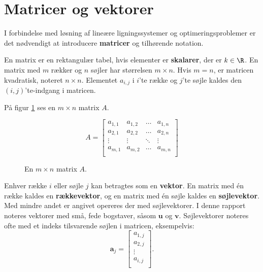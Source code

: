\section{Matricer og vektorer}
%  
%
I forbindelse med løsning af lineære ligningssystemer og optimeringsproblemer er det nødvendigt at introducere \textbf{matricer} og tilhørende notation. 
%
\begin{defn}{}{}
En matrix er en rektangulær tabel, hvis elementer er \textbf{skalarer}, der er $k \in \R$. 
En matrix med $m$ rækker og $n$ søjler har størrelsen $m \times n$.
Hvis $m=n$, er matricen kvadratisk, noteret $n \times n$.
Elementet $a_{i,j}$ i $i$'te række og $j$'te søjle kaldes den $(i,j)$'te-indgang i matricen. 
\end{defn}
\noindent
%
På figur \ref{fig:matrix_gen_eks} ses en $m \times n$ matrix $A$.
%
\begin{figure}[H]
	\begin{center}
$$
A=
\begin{bmatrix}
a_{1,1} & a_{1,2} & \ldots & a_{1,n} \\
a_{2,1} & a_{2,2} & \ldots & a_{2,n} \\
\vdots  & \vdots  & \ddots & \vdots \\
a_{m,1} & a_{m,2} & \ldots & a_{m,n} \\
\end{bmatrix}
$$
	\end{center}
	\caption{En $m \times n$ matrix $A$.}
	\label{fig:matrix_gen_eks}
\end{figure}
\noindent
%
Enhver række $i$ eller søjle $j$ kan betragtes som en \textbf{vektor}. 
En matrix med én række kaldes en \textbf{rækkevektor}, og en matrix med én søjle kaldes en \textbf{søjlevektor}. 
Med mindre andet er angivet opereres der med søjlevektorer.
I denne rapport noteres vektorer med små, fede bogstaver, såsom $\textbf{u}$ og $\textbf{v}$. 
Søjlevektorer noteres ofte med et indeks tilsvarende søjlen i matricen, eksempelvis:
%
$$
\textbf{a}_j= 
\begin{bmatrix}
a_{1,j} \\
a_{2,j} \\
\vdots \\
a_{i,j} \\
\end{bmatrix}.
$$ 
